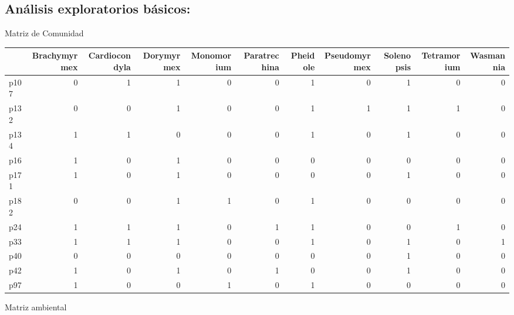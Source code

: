 \documentclass[11pt,]{article}
\newenvironment{Shaded}{\begin{snugshade}}{\end{snugshade}}
\newcommand{\StringTok}[1]{\textcolor[rgb]{0.31,0.60,0.02}{#1}}
\newcommand{\OperatorTok}[1]{\textcolor[rgb]{0.81,0.36,0.00}{\textbf{#1}}}
\newcommand{\NormalTok}[1]{#1}
\begin{document}
\subsection{Análisis exploratorios
básicos:}\label{anuxe1lisis-exploratorios-buxe1sicos}

Matriz de Comunidad

\begin{Shaded}
\end{Shaded}

\begin{longtable}[]{@{}lrrrrrrrrrr@{}}
\toprule
& Brachymyrmex & Cardiocondyla & Dorymyrmex & Monomorium & Paratrechina
& Pheidole & Pseudomyrmex & Solenopsis & Tetramorium &
Wasmannia\tabularnewline
\midrule
\endhead
p107 & 0 & 1 & 1 & 0 & 0 & 1 & 0 & 1 & 0 & 0\tabularnewline
p132 & 0 & 0 & 1 & 0 & 0 & 1 & 1 & 1 & 1 & 0\tabularnewline
p134 & 1 & 1 & 0 & 0 & 0 & 1 & 0 & 1 & 0 & 0\tabularnewline
p16 & 1 & 0 & 1 & 0 & 0 & 0 & 0 & 0 & 0 & 0\tabularnewline
p171 & 1 & 0 & 1 & 0 & 0 & 0 & 0 & 1 & 0 & 0\tabularnewline
p182 & 0 & 0 & 1 & 1 & 0 & 1 & 0 & 0 & 0 & 0\tabularnewline
p24 & 1 & 1 & 1 & 0 & 1 & 1 & 0 & 0 & 1 & 0\tabularnewline
p33 & 1 & 1 & 1 & 0 & 0 & 1 & 0 & 1 & 0 & 1\tabularnewline
p40 & 0 & 0 & 0 & 0 & 0 & 0 & 0 & 1 & 0 & 0\tabularnewline
p42 & 1 & 0 & 1 & 0 & 1 & 0 & 0 & 1 & 0 & 0\tabularnewline
p97 & 1 & 0 & 0 & 1 & 0 & 1 & 0 & 0 & 0 & 0\tabularnewline
\bottomrule
\end{longtable}

Matriz ambiental

\begin{Shaded}
\end{Shaded}
\end{document}
